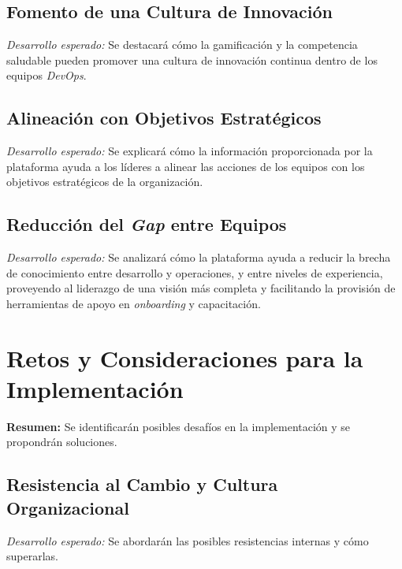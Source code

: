 \documentclass[journal]{IEEEtran}
\begin{document}
\subsection{\textbf{Fomento de una Cultura de Innovación}}

\textit{Desarrollo esperado:} Se destacará cómo la gamificación y la competencia saludable pueden promover una cultura de innovación continua dentro de los equipos \textit{DevOps}.

\subsection{\textbf{Alineación con Objetivos Estratégicos}}

\textit{Desarrollo esperado:} Se explicará cómo la información proporcionada por la plataforma ayuda a los líderes a alinear las acciones de los equipos con los objetivos estratégicos de la organización.

\subsection{\textbf{Reducción del \textit{Gap} entre Equipos}}

\textit{Desarrollo esperado:} Se analizará cómo la plataforma ayuda a reducir la brecha de conocimiento entre desarrollo y operaciones, y entre niveles de experiencia, proveyendo al liderazgo de una visión más completa y facilitando la provisión de herramientas de apoyo en \textit{onboarding} y capacitación.

\section{\textbf{\Large Retos y Consideraciones para la Implementación}}

\textbf{Resumen:} Se identificarán posibles desafíos en la implementación y se propondrán soluciones.

\subsection{\textbf{Resistencia al Cambio y Cultura Organizacional}}

\textit{Desarrollo esperado:} Se abordarán las posibles resistencias internas y cómo superarlas.
\end{document}
